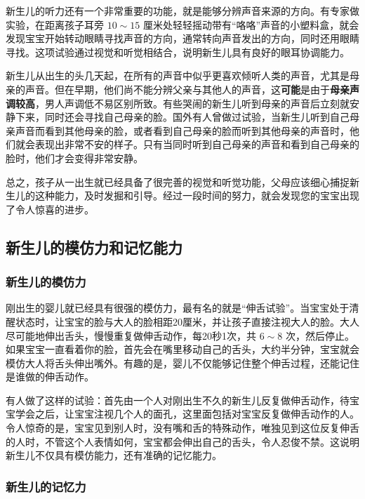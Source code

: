 新生儿的听力还有一个非常重要的功能，就是能够分辨声音来源的方向。有专家做实验，在距离孩子耳旁%
$10\sim{}15$%
厘米处轻轻摇动带有``咯咯''声音的小塑料盒，就会发现宝宝开始转动眼睛寻找声音的方向，通常转向声音发出的方向，同时还用眼睛寻找。这项试验通过视觉和听觉相结合，说明新生儿具有良好的眼耳协调能力。

新生儿从出生的头几天起，在所有的声音中似乎更喜欢倾听人类的声音，尤其是母亲的声音。但在早期，他们尚不能分辨父亲与其他人的声音，这\textbf{可能}是由于\textbf{母亲声调较高}，男人声调低不易区别所致。有些哭闹的新生儿听到母亲的声音后立刻就安静下来，同时还会寻找自己母亲的脸。国外有人曾做过试验，当新生儿听到自己母亲声音而看到其他母亲的脸，或者看到自己母亲的脸而听到其他母亲的声音时，他们就会表现出非常不安的样子。只有当同时听到自己母亲的声音和看到自己母亲的脸时，他们才会变得非常安静。

总之，孩子从一出生就已经具备了很完善的视觉和听觉功能，父母应该细心捕捉新生儿的这种能力，及时发掘和引导。经过一段时间的努力，就会发现您的宝宝出现了令人惊喜的进步。

\subsection{新生儿的模仿力和记忆能力}

\subsubsection{新生儿的模仿力}

刚出生的婴儿就已经具有很强的模仿力，最有名的就是``伸舌试验''。当宝宝处于清醒状态时，让宝宝的脸与大人的脸相距20厘米，并让孩子直接注视大人的脸。大人尽可能地伸出舌头，慢慢重复做伸舌动作，每20秒1次，共%
$6\sim{}8$%
次，然后停止。如果宝宝一直看着你的脸，首先会在嘴里移动自己的舌头，大约半分钟，宝宝就会模仿大人将舌头伸出嘴外。有趣的是，婴儿不仅能够记住整个伸舌过程，还能记住是谁做的伸舌动作。

有人做了这样的试验：首先由一个人对刚出生不久的新生儿反复做伸舌动作，待宝宝学会之后，让宝宝注视几个人的面孔，这里面包括对宝宝反复做伸舌动作的人。令人惊奇的是，宝宝见到别人时，没有嘴和舌的特殊动作，唯独见到这位反复伸舌的人时，不管这个人表情如何，宝宝都会伸出自己的舌头，令人忍俊不禁。这说明新生儿不仅具有模仿能力，还有准确的记忆能力。

\subsubsection{%
新生儿的记忆力}%

